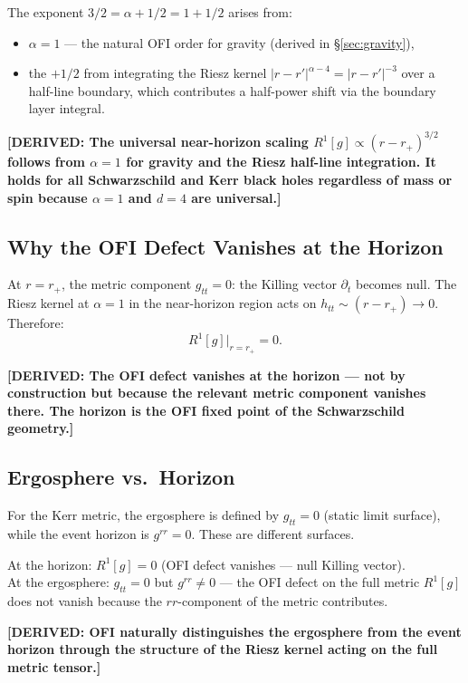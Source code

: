 \documentclass[12pt]{article}
\theoremstyle{definition}
\newcommand{\abs}[1]{\left|#1\right|}
\newcommand{\DERIVED}[1]{\textcolor{derivedcolor}{\textbf{[DERIVED: #1]}}}
\begin{document}
The exponent $3/2 = \alpha + 1/2 = 1 + 1/2$ arises from:
\begin{itemize}
  \item $\alpha = 1$ — the natural OFI order for gravity (derived in §\ref{sec:gravity}),
  \item the $+1/2$ from integrating the Riesz kernel $\abs{r-r'}^{\alpha-4}
    = \abs{r-r'}^{-3}$ over a half-line boundary, which contributes a
    half-power shift via the boundary layer integral.
\end{itemize}

\DERIVED{The universal near-horizon scaling $R^1[g] \propto (r-r_+)^{3/2}$
follows from $\alpha=1$ for gravity and the Riesz half-line integration.
It holds for all Schwarzschild and Kerr black holes regardless of mass or
spin because $\alpha=1$ and $d=4$ are universal.}

\subsection{Why the OFI Defect Vanishes at the Horizon}

At $r = r_+$, the metric component $g_{tt} = 0$: the Killing vector
$\partial_t$ becomes null.  The Riesz kernel at $\alpha=1$ in the
near-horizon region acts on $h_{tt} \sim (r-r_+) \to 0$.  Therefore:
\begin{equation}
  R^1[g]\big|_{r = r_+} = 0.
\end{equation}

\DERIVED{The OFI defect vanishes at the horizon — not by construction
but because the relevant metric component vanishes there.  The horizon
is the OFI fixed point of the Schwarzschild geometry.}

\subsection{Ergosphere vs.\ Horizon}

For the Kerr metric, the ergosphere is defined by $g_{tt} = 0$ (static
limit surface), while the event horizon is $g^{rr} = 0$.  These are
different surfaces.

At the horizon: $R^1[g] = 0$ (OFI defect vanishes — null Killing vector).\\
At the ergosphere: $g_{tt} = 0$ but $g^{rr} \neq 0$ — the OFI defect on the
full metric $R^1[g]$ does not vanish because the $rr$-component of the
metric contributes.

\DERIVED{OFI naturally distinguishes the ergosphere from the event horizon
through the structure of the Riesz kernel acting on the full metric tensor.}
\end{document}
